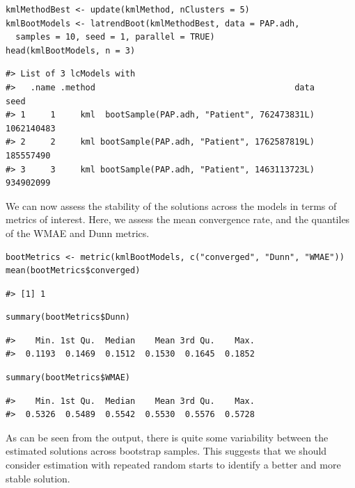 \begin{verbatim}
kmlMethodBest <- update(kmlMethod, nClusters = 5)
kmlBootModels <- latrendBoot(kmlMethodBest, data = PAP.adh,
  samples = 10, seed = 1, parallel = TRUE)
head(kmlBootModels, n = 3)
\end{verbatim}

\begin{verbatim}
#> List of 3 lcModels with
#>   .name .method                                        data       seed
#> 1     1     kml  bootSample(PAP.adh, "Patient", 762473831L) 1062140483
#> 2     2     kml bootSample(PAP.adh, "Patient", 1762587819L)  185557490
#> 3     3     kml bootSample(PAP.adh, "Patient", 1463113723L)  934902099
\end{verbatim}

We can now assess the stability of the solutions across the models in terms of metrics of interest. Here, we assess the mean convergence rate, and the quantiles of the WMAE and Dunn metrics.

\begin{verbatim}
bootMetrics <- metric(kmlBootModels, c("converged", "Dunn", "WMAE"))
mean(bootMetrics$converged)
\end{verbatim}

\begin{verbatim}
#> [1] 1
\end{verbatim}

\begin{verbatim}
summary(bootMetrics$Dunn)
\end{verbatim}

\begin{verbatim}
#>    Min. 1st Qu.  Median    Mean 3rd Qu.    Max. 
#>  0.1193  0.1469  0.1512  0.1530  0.1645  0.1852
\end{verbatim}

\begin{verbatim}
summary(bootMetrics$WMAE)
\end{verbatim}

\begin{verbatim}
#>    Min. 1st Qu.  Median    Mean 3rd Qu.    Max. 
#>  0.5326  0.5489  0.5542  0.5530  0.5576  0.5728
\end{verbatim}

As can be seen from the output, there is quite some variability between the estimated solutions across bootstrap samples. This suggests that we should consider estimation with repeated random starts to identify a better and more stable solution.

